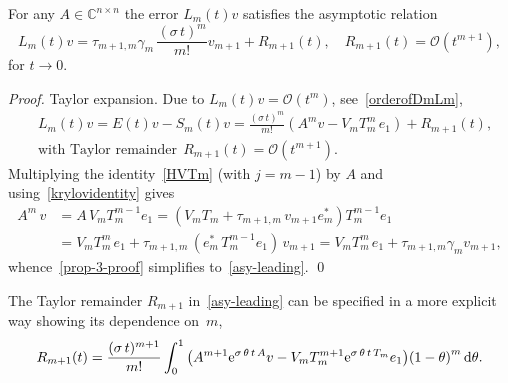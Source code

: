 \documentclass[smallextended]{svjour3pre}%
\numberwithin{equation}{section}
\numberwithin{figure}{section}
\numberwithin{table}{section}
\newcommand{\C}{\mathbb C}%
\newcommand\tjnew[1]{{#1}}
\newcommand{\dd}{\mathrm{d}}
\newcommand{\ee}{{\rm e}}
\newcommand\sca{\sigma}
\newcommand\Opgen{A}
\begin{document}
\begin{proposition}\label{prop:prop3}
\noindent
For any $ A \in \C^{\tjnew{n \times n}} $
the error $ L_m(t)v $ satisfies the asymptotic relation
\begin{equation} \label{asy-leading}
L_m(t)v = \tau_{m+1,m}\gamma_m\,\frac{(\sca\,t)^{m}}{m!}v_{m+1} + R_{m+1}(t),
\quad R_{m+1}(t) = {\mathcal{O}}(t^{m+1}),
\end{equation}
for $ t \to 0 $.
\end{proposition}
%
\tjnew{
\begin{proof}
Taylor expansion. Due to $ L_m(t)v = {\mathcal{O}}(t^m) $, \tjnew{see~\eqref{orderofDmLm},}
\begin{equation}\label{prop-3-proof}
\begin{aligned}
&L_m(t)v = E(t)v - S_m(t)v
= \frac{(\sca\,t)^m}{{m!}}(\Opgen^m v - V_m T_m^m\,e_1) + R_{m+1}(t),\\
&\text{with Taylor remainder}~~ R_{m+1}(t) = {\mathcal{O}}(t^{m+1}).
\end{aligned}
\end{equation}
Multiplying the
identity~\tjnew{{\eqref{HVTm}} (with $ j = m-1 $) by $ A $} and using~\eqref{krylovidentity} gives
\begin{align*}
\Opgen^m\,v
&= \Opgen\,V_m T_m^{m-1} e_1
 = (V_m T_m + \tau_{m+1,m}\,v_{m+1} e_m^\ast) T_m^{m-1} e_1 \\
&= V_m T_m^m\,e_1 + \tau_{m+1,m}\, (e_m^\ast\,T_m^{m-1} e_1)\,v_{m+1}
 = V_m T_m^m\,e_1 + \tau_{m+1,m} \gamma_m v_{m+1},
\end{align*}
whence~\eqref{prop-3-proof} simplifies to~\eqref{asy-leading}. \qed
\end{proof}
}

\tjnew{
\begin{remark}
The Taylor remainder $ R_{m+1} $ in~\eqref{asy-leading}
can be specified in a more explicit way showing its dependence on~$ m $,
$$
R_{m+1}(t)
= \frac{(\sigma\,t)^{m+1}}{m!} \int_{0}^{1} \big(A^{m+1} \ee^{\sigma\,\theta\,t\,A} v - V_m T_m^{m+1}\ee^{\sigma\,\theta\,t\,T_m} e_1 \big){(1-\theta)}^m\,\dd\theta .
$$
\end{remark}}
\end{document}
